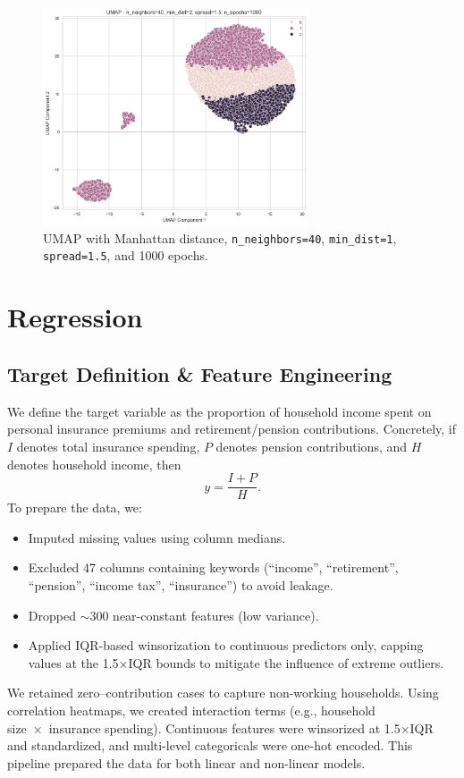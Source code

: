 \documentclass{article}
\begin{document}
\begin{figure}[H]
    \centering
    \includegraphics[width=0.7\textwidth]{figures/output3.png}
    \caption{UMAP with Manhattan distance, \texttt{n\_neighbors=40}, \texttt{min\_dist=1}, \texttt{spread=1.5}, and 1000 epochs.}
    \label{fig:umap_final}
\end{figure}


\section{Regression}
\subsection*{Target Definition \& Feature Engineering}
We define the target variable as the proportion of household income spent on personal insurance premiums and retirement/pension contributions. Concretely, if $I$ denotes total insurance spending, $P$ denotes pension contributions, and $H$ denotes household income, then
\[
  y = \frac{I + P}{H}.
\]
To prepare the data, we:
\begin{itemize}
  \item Imputed missing values using column medians.
  \item Excluded 47 columns containing keywords (``income'', ``retirement'', ``pension'', ``income tax'', ``insurance'') to avoid leakage.
  \item Dropped $\sim$300 near-constant features (low variance).
  \item Applied IQR-based winsorization to continuous predictors only, capping values at the 1.5\(\times\)IQR bounds to mitigate the influence of extreme outliers.
\end{itemize}

We retained zero–contribution cases to capture non-working households. Using correlation heatmaps, we created interaction terms (e.g., household size × insurance spending). Continuous features were winsorized at 1.5×IQR and standardized, and multi-level categoricals were one-hot encoded. This pipeline prepared the data for both linear and non-linear models.
\end{document}

